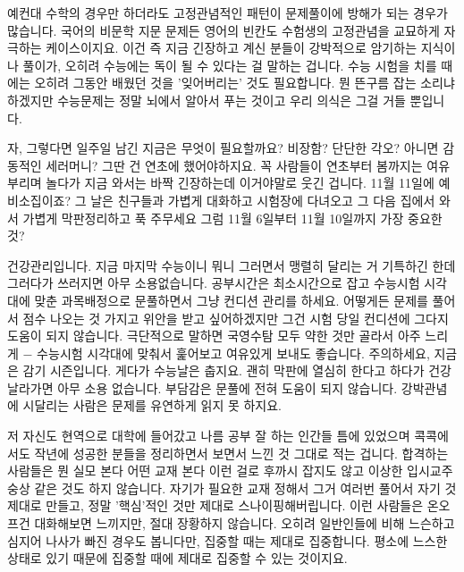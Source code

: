 예컨대 수학의 경우만 하더라도 고정관념적인 패턴이 문제풀이에 방해가 되는 경우가 많습니다.
국어의 비문학 지문 문제든 영어의 빈칸도 수험생의 고정관념을 교묘하게 자극하는 케이스이지요.
이건 즉 지금 긴장하고 계신 분들이 강박적으로 암기하는 지식이나 풀이가, 오히려 수능에는 독이 될 수 있다는 걸 말하는 겁니다.
수능 시험을 치를 때에는 오히려 그동안 배웠던 것을 '잊어버리는' 것도 필요합니다.
뭔 뜬구름 잡는 소리냐 하겠지만 수능문제는 정말 뇌에서 알아서 푸는 것이고 우리 의식은 그걸 거들 뿐입니다.
\vspace{5mm}

자, 그렇다면 일주일 남긴 지금은 무엇이 필요할까요? 비장함? 단단한 각오? 아니면 감동적인 세러머니?
그딴 건 연초에 했어야하지요. 꼭 사람들이 연초부터 봄까지는 여유부리며 놀다가 지금 와서는 바짝 긴장하는데 이거야말로 웃긴 겁니다.
11월 11일에 예비소집이죠? 그 날은 친구들과 가볍게 대화하고 시험장에 다녀오고 그 다음 집에서 와서 가볍게 막판정리하고 푹 주무세요
그럼 11월 6일부터 11월 10일까지 가장 중요한 것?
\vspace{5mm}

건강관리입니다. 지금 마지막 수능이니 뭐니 그러면서 맹렬히 달리는 거 기특하긴 한데 그러다가 쓰러지면 아무 소용없습니다.
공부시간은 최소시간으로 잡고 수능시험 시각대에 맞춘 과목배정으로 문풀하면서 그냥 컨디션 관리를 하세요.
어떻게든 문제를 풀어서 점수 나오는 것 가지고 위안을 받고 싶어하겠지만 그건 시험 당일 컨디션에 그다지 도움이 되지 않습니다.
극단적으로 말하면 국영수탐 모두 약한 것만 골라서 아주 느리게 $-$ 수능시험 시각대에 맞춰서 훑어보고 여유있게 보내도 좋습니다.
주의하세요, 지금은 감기 시즌입니다. 게다가 수능날은 춥지요. 괜히 막판에 열심히 한다고 하다가 건강 날라가면 아무 소용 없습니다.
부담감은 문풀에 전혀 도움이 되지 않습니다. 강박관념에 시달리는 사람은 문제를 유연하게 읽지 못 하지요.
\vspace{5mm}

저 자신도 현역으로 대학에 들어갔고 나름 공부 잘 하는 인간들 틈에 있었으며
콕콕에서도 작년에 성공한 분들을 정리하면서 보면서 느낀 것 그대로 적는 겁니다.
합격하는 사람들은 뭔 실모 본다 어떤 교재 본다 이런 걸로 후까시 잡지도 않고 이상한 입시교주 숭상 같은 것도 하지 않습니다.
자기가 필요한 교재 정해서 그거 여러번 풀어서 자기 것 제대로 만들고, 정말 '핵심'적인 것만 제대로 스나이핑해버립니다.
이런 사람들은 온오프건 대화해보면 느끼지만, 절대 장황하지 않습니다.
오히려 일반인들에 비해 느슨하고 심지어 나사가 빠진 경우도 봅니다만, 집중할 때는 제대로 집중합니다.
평소에 느스한 상태로 있기 때문에 집중할 때에 제대로 집중할 수 있는 것이지요.
\vspace{5mm}

